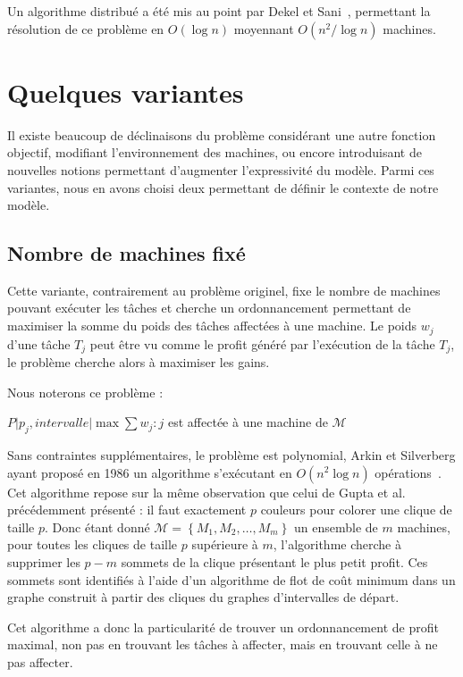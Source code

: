 \documentclass[a4paper,11pt]{report}
\begin{document}
Un algorithme distribué a été mis au point par Dekel et Sani~\cite{dekel1983parallel}, permettant la
résolution de ce problème en $O(\log n)$ moyennant $O(n^2 / \log n)$ machines.

\section{Quelques variantes}

Il existe beaucoup de déclinaisons du problème \bisched{} considérant une autre fonction objectif,
modifiant l'environnement des machines, ou encore introduisant de nouvelles notions permettant
d'augmenter l'expressivité du modèle. Parmi ces variantes, nous en avons choisi deux permettant de
définir le contexte de notre modèle.

\subsection{Nombre de machines fixé}

Cette variante, contrairement au problème originel, fixe le nombre de machines pouvant exécuter les
tâches et cherche un ordonnancement permettant de maximiser la somme du poids des tâches affectées à
une machine. Le poids $w_j$ d'une tâche $T_j$ peut être vu comme le profit généré par l'exécution de
la tâche $T_j$, le problème cherche alors à maximiser les gains.

Nous noterons ce problème :
\begin{center}
    $P \Big| p_j, intervalle \Big| \max \sum w_j : j$ est affectée à une machine de $\mathcal{M}$
\end{center}

Sans contraintes supplémentaires, le problème est polynomial, Arkin et Silverberg ayant proposé en
1986 un algorithme s'exécutant en $O(n^2 \log n)$ opérations~\cite{arkin_scheduling_1987}. Cet
algorithme repose sur la même observation que celui de Gupta et al.~\cite{gupta_optimal_1978} précédemment présenté : il faut
exactement $p$ couleurs pour colorer une clique de taille $p$. Donc étant donné $\mathcal{M}=\left\{
M_1, M_2, \dots, M_m \right\}$ un ensemble de $m$ machines, pour toutes les cliques de taille
$p$ supérieure à $m$, l'algorithme cherche à supprimer les $p - m$ sommets de la clique présentant
le plus petit profit. Ces sommets sont identifiés à l'aide d'un algorithme de flot de coût minimum
dans un graphe construit à partir des cliques du graphes d'intervalles de départ.

Cet algorithme a donc la particularité de trouver un ordonnancement de profit maximal, non pas en
trouvant les tâches à affecter, mais en trouvant celle à ne pas affecter.
\end{document}
